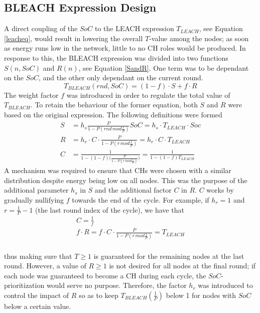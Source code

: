 \subsection{BLEACH Expression Design}
A direct coupling of the $SoC$ to the LEACH expression $T_{LEACH}$, see Equation \ref{leacheq}, would result in lowering the overall $T$-value among the nodes; as soon as energy runs low in the network, little to no CH roles would be produced. In response to this, the BLEACH expression was divided into two functions $S(n, SoC)$ and $R(n)$, see Equation \ref{SandR}. One term was to be dependant on the $SoC$, and the other only dependant on the current round. 
\begin{equation}
    \label{SandR}
    T_{BLEACH}(rnd, SoC) = (1-f)\cdot S + f\cdot R
\end{equation}
The weight factor $f$ was introduced in order to regulate the total value of $T_{BLEACH}$. To retain the behaviour of the former equation, both
$S$ and $R$ were based on the original expression. \newline
The following definitions were formed
\begin{align}
    \label{SandRexpanded}
    S &= h_s\frac{P}{1-P(rnd\,mod\frac{1}{P})}SoC = h_s\cdot T_{LEACH} \cdot Soc\\
    R &= h_r\cdot C \cdot \frac{P}{1-P(r\,mod\frac{1}{P})} = h_r \cdot C \cdot T_{LEACH}\\
    C &= \frac{1}{1-(1-f)\big(\frac{P}{1-P(r\,mod\frac{1}{P})}\big)} = \frac{1}{1-(1-f)T_{LEACH}}
\end{align}
\noindent A mechanism was required to ensure that CHs were chosen with a similar distribution despite energy being low on all nodes. This was the purpose of the additional parameter $h_s$ in $S$ and the additional factor $C$ in $R$. 
$C$ works by gradually nullifying $f$ towards the end of the cycle. For example, if $h_r = 1$ and $r = \frac{1}{P}-1$ (the last round index of the cycle), we have that
\begin{align}
    C = \frac{1}{f} \\
    f\cdot R = f\cdot C \cdot \frac{P}{1-P(r\,mod\frac{1}{P})} = T_{LEACH}\\
\end{align}

thus making sure that $T\geq1$ is guaranteed for the remaining nodes at the last round. However, a value of $R\geq1$ is not desired for all nodes at the final round; if each node was guaranteed to become a CH during each cycle, the $SoC$-prioritization would serve no purpose. Therefore, the factor $h_r$ was introduced to control the impact of $R$ so as to keep $T_{BLEACH}(\frac{1}{P})$ below 1 for nodes with $SoC$ below a certain value.\newline

